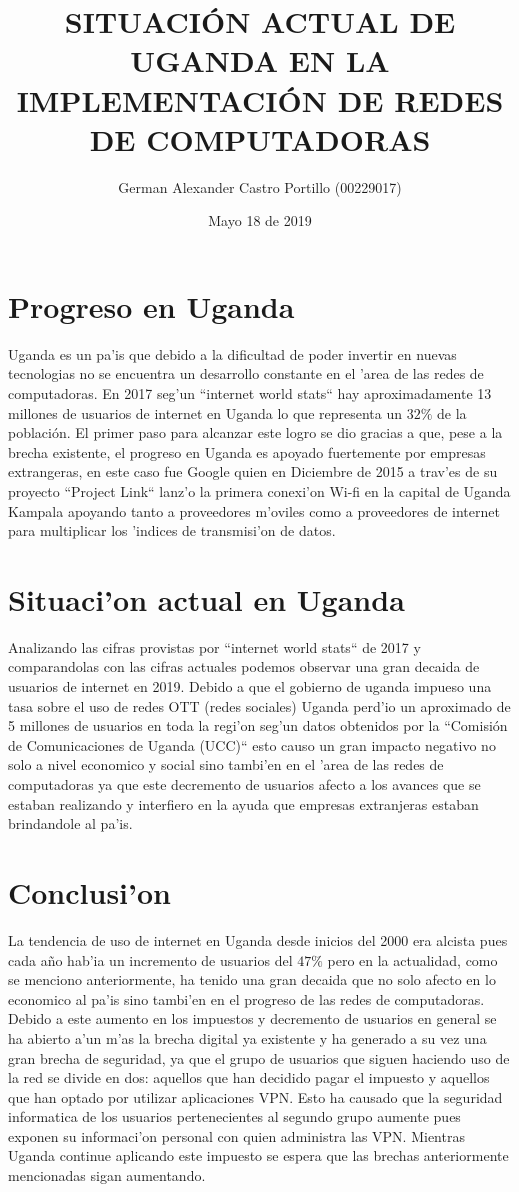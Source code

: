 \documentclass{article}
\title{SITUACI\'ON ACTUAL DE UGANDA EN LA IMPLEMENTACI\'ON DE REDES DE COMPUTADORAS\\}
\author{German Alexander Castro Portillo (00229017)}
\date{Mayo 18 de 2019}
\begin{document}
	\maketitle

	\section{Progreso en Uganda}
		\large{
			Uganda es un pa'is que debido a la dificultad de poder invertir en nuevas tecnologias no se encuentra un desarrollo constante en el 'area de las redes de computadoras. En 2017 seg'un ``internet world stats`` hay aproximadamente 13 millones de usuarios de internet en Uganda lo que representa un $32\%$ de la población. El primer paso para alcanzar este logro se dio gracias a que, pese a la brecha existente, el progreso en Uganda es apoyado fuertemente por empresas extrangeras, en este caso fue Google quien en Diciembre de 2015 a trav'es de su proyecto ``Project Link`` lanz'o la primera conexi'on Wi-fi en la capital de Uganda Kampala apoyando tanto a proveedores m'oviles como a proveedores de internet para multiplicar los 'indices de transmisi'on de datos.    
		}
	\section{Situaci'on actual en Uganda}
		\large{
			Analizando las cifras provistas por ``internet world stats`` de 2017 y comparandolas con las cifras actuales podemos observar una gran decaida de usuarios de internet en 2019. Debido a que el gobierno de uganda impueso una tasa sobre el uso de redes OTT (redes sociales) Uganda perd'io un aproximado de 5 millones de usuarios en toda la regi'on seg'un datos obtenidos por la ``Comisión de Comunicaciones de Uganda (UCC)`` esto causo un gran impacto negativo no solo a nivel economico y social sino tambi'en en el 'area de las redes de computadoras ya que este decremento de usuarios afecto a los avances que se estaban realizando y interfiero en la ayuda que empresas extranjeras estaban brindandole al pa'is.
		}
	\section{Conclusi'on}
		\large{
			La tendencia de uso de internet en Uganda desde inicios del 2000 era alcista pues cada año hab'ia un incremento de usuarios del $47\%$ pero en la actualidad, como se menciono anteriormente, ha tenido una gran decaida que no solo afecto en lo economico al pa'is sino tambi'en en el progreso de las redes de computadoras. Debido a este aumento en los impuestos y decremento de usuarios en general se ha abierto a'un m'as la brecha digital ya existente y ha generado a su vez una gran brecha de seguridad, ya que el grupo de usuarios que siguen haciendo uso de la red se divide en dos: aquellos que han decidido pagar el impuesto y aquellos que han optado por utilizar aplicaciones VPN. Esto ha causado que la seguridad informatica de los usuarios pertenecientes al segundo grupo aumente pues exponen su informaci'on personal con quien administra las VPN. Mientras Uganda continue aplicando este impuesto se espera que las brechas anteriormente mencionadas sigan aumentando.
		}
\end{document}
